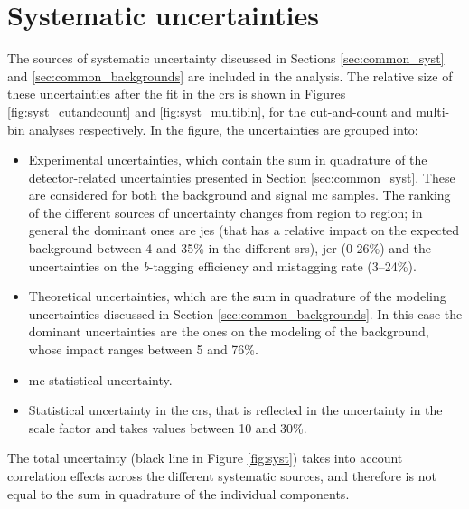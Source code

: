 \section{Systematic uncertainties}
\label{sec:strong:syst}

The sources of systematic uncertainty discussed in Sections \ref{sec:common_syst} and \ref{sec:common_backgrounds} are included in the analysis.
The relative size of these uncertainties after the fit in the \glspl{cr} is shown in Figures \ref{fig:syst_cutandcount} and \ref{fig:syst_multibin},
for the cut-and-count and multi-bin analyses respectively. 
In the figure, the uncertainties are grouped into:
\begin{itemize}
\item Experimental uncertainties, which contain the sum in quadrature of the detector-related uncertainties 
presented in Section \ref{sec:common_syst}. These are considered for both the background and signal \gls{mc} samples.
The ranking of the different sources of uncertainty changes from region to region; in general the dominant ones are \gls{jes} (that has a 
relative impact on the expected background between 4 and 35\% in the different \glspl{sr}), \gls{jer} (0-26\%) and the uncertainties on the 
\textit{b}-tagging efficiency and mistagging rate (3--24\%).

\item Theoretical uncertainties, which are the sum in quadrature of the modeling uncertainties discussed in Section \ref{sec:common_backgrounds}.
In this case the dominant uncertainties are the ones on the modeling of the \ttbar background, whose impact ranges between 5 and 76\%.

\item \gls{mc} statistical uncertainty.

\item Statistical uncertainty in the \glspl{cr}, that is reflected in the uncertainty in the \ttbar scale factor and takes values between 10 and 30\%.

\end{itemize}

The total uncertainty (black line in Figure \ref{fig:syst}) takes into account correlation effects across the different systematic sources, 
and therefore is not equal to the sum in quadrature of the individual components. 

